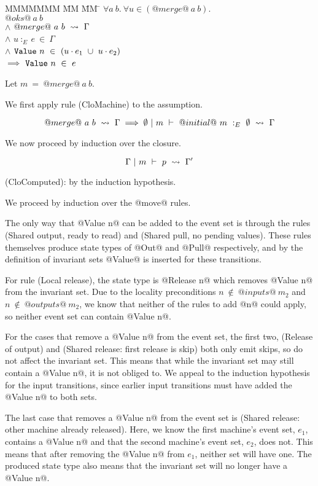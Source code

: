 \begin{tabbing}
MMMMMMM \= MM \= MM \= \kill
$\forall a~b.\ \forall u \in (@merge@~a~b).$
\\
\>
\> $@oks@~a~b$
\\
\> $\wedge$
\> $@merge@~a~b ~\rightsquigarrow~ \Gamma$
\\
\> $\wedge$
\> $u~:_E~e~\in~\Gamma$
\\
\> $\wedge$
\> $\mathtt{Value}~n~\in~(u \cdot e_1~\cup~u \cdot e_2)$
\\
\> $\implies$
\> $\mathtt{Value}~n~\in~e$
\end{tabbing}

Let $m~=~@merge@~a~b$.

We first apply rule (CloMachine) to the assumption.

$$
@merge@~a~b ~\rightsquigarrow~ \Gamma
\implies
\emptyset ~|~ m ~\vdash~ @initial@~m~:_E~\emptyset ~\rightsquigarrow~ \Gamma
$$

We now proceed by induction over the closure.

$$
\Gamma ~|~ m ~\vdash~ p ~\rightsquigarrow~ \Gamma'
$$

(CloComputed): by the induction hypothesis.

We proceed by induction over the @move@ rules.

The only way that @Value n@ can be added to the event set is through the rules (Shared output, ready to read) and (Shared pull, no pending values).
These rules themselves produce state types of @Out@ and @Pull@ respectively, and by the definition of invariant sets @Value@ is inserted for these transitions.

For rule (Local release), the state type is @Release n@ which removes @Value n@ from the invariant set.
Due to the locality preconditions $n~\not\in~@inputs@~m_2$ and $n~\not\in~@outputs@~m_2$, we know that neither of the rules to add @n@ could apply, so neither event set can contain @Value n@.

For the cases that remove a @Value n@ from the event set, the first two, (Release of output) and (Shared release: first release is skip) both only emit skips, so do not affect the invariant set.
This means that while the invariant set may still contain a @Value n@, it is not obliged to.
We appeal to the induction hypothesis for the input transitions, since earlier input transitions must have added the @Value n@ to both sets.

The last case that removes a @Value n@ from the event set is (Shared release: other machine already released).
Here, we know the first machine's event set, $e_1$, contains a @Value n@ and that the second machine's event set, $e_2$, does not.
This means that after removing the @Value n@ from $e_1$, neither set will have one.
The produced state type also means that the invariant set will no longer have a @Value n@.

